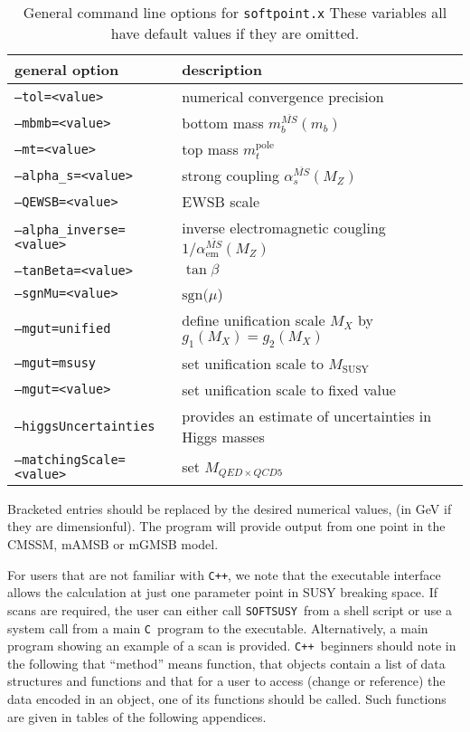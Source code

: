 \documentclass{article}
\def\SOFTSUSY{{\tt SOFTSUSY}}
\def\code#1{\small{\tt #1}\normalsize}
\begin{document}
\begin{table}[tbh]
  \centering
  \begin{tabular}{ll}
    general option & description \\
    \hline
    \code{--tol=<value>} & numerical convergence precision \\
    \code{--mbmb=<value>} & bottom mass $m_b^{\overline{MS}}(m_b)$ \\
    \code{--mt=<value>} & top mass $m_t^\text{pole}$ \\
    \code{--alpha\_s=<value>} & strong coupling $\alpha_s^{\overline{MS}}(M_Z)$ \\
    \code{--QEWSB=<value>} & EWSB scale \\
    \code{--alpha\_inverse=<value>} & inverse electromagnetic cougling
    $1/\alpha^{\overline{MS}}_\text{em}(M_Z)$ \\
    \code{--tanBeta=<value>} & $\tan\beta$ \\
    \code{--sgnMu=<value>} & $\text{sgn}(\mu$) \\
    \code{--mgut=unified} & define unification scale $M_X$ by $g_1(M_X)=g_2(M_X)$ \\
    \code{--mgut=msusy} & set unification scale to $M_\text{SUSY}$ \\
    \code{--mgut=<value>} & set unification scale to fixed value \\
    \code{--higgsUncertainties} & provides an estimate of uncertainties in
      Higgs masses\\
    \code{--matchingScale=<value>} & set $M_{QED \times QCD5}$ \\
    \hline
  \end{tabular}
  \caption{General command line options for \code{softpoint.x} These variables
    all have  default values if they are omitted.}
  \label{tab:general-cmd-line-options}
\end{table}
%
Bracketed entries should be replaced by the desired numerical values, (in GeV
if they are dimensionful). The program will provide output from one point in
the CMSSM, mAMSB or mGMSB model. 

For users that are not familiar with \code{C++}, we note that the executable
interface allows the calculation at just one parameter point in SUSY breaking 
space. If scans are required, the user can either call \SOFTSUSY~from a
shell script or use a system call from a main \code{C}~program to the
executable. Alternatively, a main program showing an example of a scan is
provided. \code{C++}~beginners should note in
the following that ``method'' means function, that objects contain a list of
data structures and functions and that for a user to access (change
or reference) the data encoded in an object, one of its functions should be
called. Such functions are given in tables of the following appendices.
\end{document}
